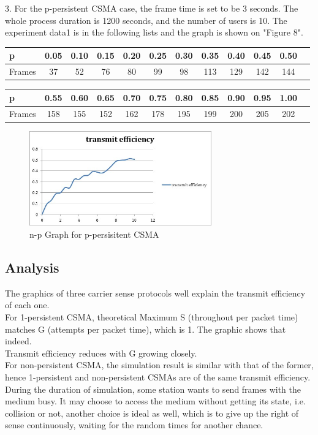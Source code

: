 \documentclass[11pt,a4paper]{report}
\begin{document}
3. For the p-persistent CSMA case, the frame time is set to be 3 seconds. The whole process duration is 1200 seconds, and the number of users is 10. The experiment data1 is in the following lists and the graph is shown on "Figure 8".
\begin{table}[htbp]
\begin{tabular}{lccccccccccc}
\toprule
p & 0.05 & 0.10 & 0.15  & 0.20 & 0.25 & 0.30 & 0.35 & 0.40 & 0.45 & 0.50 \\
\midrule
Frames & 37 & 52 & 76 & 80 & 99 & 98 & 113 & 129 & 142 & 144 \\
\bottomrule
\end{tabular}
\end{table}

\begin{table}[htbp]
\begin{tabular}{lccccccccccc}
\toprule
p & 0.55 & 0.60 & 0.65  & 0.70 & 0.75 & 0.80 & 0.85 & 0.90 & 0.95 & 1.00 \\
\midrule
Frames & 158 & 155 & 152 & 162 & 178 & 195 & 199 & 200 & 205 & 202 \\
\bottomrule
\end{tabular}
\end{table}

\begin{figure}
\centering
\includegraphics[width=0.7\textwidth]{3_4.jpg}
\caption{n-p Graph for p-persisitent CSMA}
\end{figure}

\subsection*{Analysis}
The graphics of three carrier sense protocols well explain the transmit efficiency of each one. \\

For 1-persistent CSMA, theoretical Maximum S (throughout per packet time) matches G (attempts per packet time), which is 1. The graphic shows that indeed. \\
Transmit efficiency reduces with G growing closely. \\
For non-persistent CSMA, the simulation result is similar with that of the former, hence 1-persistent and non-persistent CSMAs are of the same transmit efficiency. \\
During the duration of simulation, some station wants to send frames with the medium busy. It may choose to access the medium without getting its state, i.e. collision or not, another choice is ideal as well, which is to give up the right of sense continuously, waiting for the random times for another chance. \\
\end{document}
